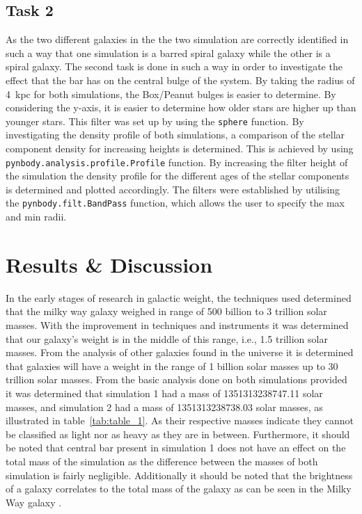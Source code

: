 \documentclass[12pt, a4paper]{article}
\begin{document}
  \subsection*{Task 2}
    As the two different galaxies in the the two simulation are correctly identified in such a way that one simulation is a barred spiral galaxy while the other is a spiral galaxy. The second task is done in such a way in order to investigate the effect that the bar has on the central bulge of the system. By taking the radius of 4~\unit{kpc} for both simulations, the Box/Peanut bulges is easier to determine. By considering the y-axis, it is easier to determine how older stars are higher up than younger stars. This filter was set up by using the \lstinline[language=iPython]{sphere} function. By investigating the density profile of both simulations, a comparison of the stellar component density for increasing heights is determined. This is achieved by using \lstinline[language=iPython]{pynbody.analysis.profile.Profile} function. By increasing the filter height of the simulation the density profile for the different ages of the stellar components is determined and plotted accordingly. The filters were established by utilising the \lstinline[language=iPython]{pynbody.filt.BandPass} function, which allows the user to specify the max and min radii.

\section{Results \& Discussion}
In the early stages of research in galactic weight, the techniques used determined that the milky way galaxy weighed in range of 500 billion to 3 trillion solar masses. With the improvement in techniques and instruments it was determined that our galaxy's weight is in the middle of this range, i.e., 1.5 trillion solar masses. From the analysis of other galaxies found in the universe it is determined that galaxies will have a weight in the range of 1 billion solar masses up to 30 trillion solar masses. From the basic analysis done on both simulations provided it was determined that simulation 1 had a mass of 1351313238747.11 solar masses, and simulation 2 had a mass of 1351313238738.03 solar masses, as illustrated in table~\ref{tab:table_1}. As their respective masses indicate they cannot be classified as light nor as heavy as they are in between. Furthermore, it should be noted that central bar present in simulation 1 does not have an effect on the total mass of the simulation as the difference between the masses of both simulation is fairly negligible. Additionally it should be noted that the brightness of a galaxy correlates to the total mass of the galaxy as can be seen in the Milky Way galaxy \parencite{hilleWhatDoesMilky2019}.
\end{document}
